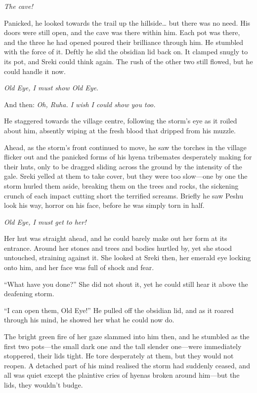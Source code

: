 \emph{The cave!}

Panicked, he looked towards the trail up the hillside\ldots{} but there was no need. His doors were still open, and the cave was there within him. Each pot was there, and the three he had opened poured their brilliance through him. He stumbled with the force of it. Deftly he slid the obsidian lid back on. It clamped snugly to its pot, and Sreki could think again. The rush of the other two still flowed, but he could handle it now.

\emph{Old Eye, I must show Old Eye.}

And then: \emph{Oh, Ruha. I wish I could show you too.}

He staggered towards the village centre, following the storm's eye as it roiled about him, absently wiping at the fresh blood that dripped from his muzzle.

Ahead, as the storm's front continued to move, he saw the torches in the village flicker out and the panicked forms of his hyena tribemates desperately making for their huts, only to be dragged sliding across the ground by the intensity of the gale. Sreki yelled at them to take cover, but they were too slow---one by one the storm hurled them aside, breaking them on the trees and rocks, the sickening crunch of each impact cutting short the terrified screams. Briefly he saw Peshu look his way, horror on his face, before he was simply torn in half.

\emph{Old Eye, I must get to her!}

Her hut was straight ahead, and he could barely make out her form at its entrance. Around her stones and trees and bodies hurtled by, yet she stood untouched, straining against it. She looked at Sreki then, her emerald eye locking onto him, and her face was full of shock and fear.

``What have you done?'' She did not shout it, yet he could still hear it above the deafening storm.

``I can open them, Old Eye!'' He pulled off the obsidian lid, and as it roared through his mind, he showed her what he could now do.

The bright green fire of her gaze slammed into him then, and he stumbled as the first two pots---the small dark one and the tall slender one---were immediately stoppered, their lids tight. He tore desperately at them, but they would not reopen. A detached part of his mind realised the storm had suddenly ceased, and all was quiet except the plaintive cries of hyenas broken around him---but the lids, they wouldn't budge.

